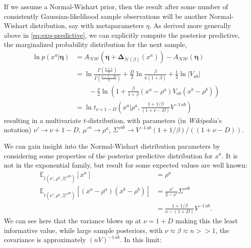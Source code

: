 \documentclass[aps,showpacs,twocolumn,prd,superscriptaddress,nofootinbib]{revtex4}
\newcommand{\nn}{\nonumber}
\newcommand{\E}[1]{{\mathbb E}_{#1}\!}
\begin{document}
If we assume a Normal-Wishart prior, then the result after some number of consistently Gaussian-likelihood sample observations will be another Normal-Wishart distribution, say with metaparameters $\eta$.  As derived more generally above in \eqref{eq:exp-predictive}, we can explicitly compute the posterior predictive, the marginalized probability distribution for the next sample,
\begin{align}
  \ln p(x^a|\bm\eta)&=A_{\mathcal{NW}}(\bm\eta+\bm\Delta_{\mathcal{N}(\beta)}(x^a))-A_{\mathcal{NW}}(\bm\eta)\nn\\
  &=\ln\frac{\Gamma\left(\frac{\nu+1}2\right)}{\Gamma\left(\frac{\nu+1-D}{2}\right)}+\frac D2\ln\frac{\beta}{\pi(1+\beta)}+\frac12\ln\left|V_{ab}\right|
  \nn\\&\qquad
  -\frac\nu2\ln\left(1+\frac\beta{1+\beta}(x^a-\rho^a)V_{ab}(x^b-\rho^b)\right)\nn\\
  &=\ln t_{\nu+1-D}\left(x^a\big|\rho^a,\frac{1+1/\beta}{(1+\nu-D)}V^{-1\,ab}\right)\label{eq:norm-predictive}
\end{align}
resulting in a multivariate $t$-distribution, with parameters (in \textit{Wikipedia}'s notation) $\nu'\rightarrow\nu+1-D$, $\mu'^a\rightarrow\rho^a$, $\Sigma'^{ab}\rightarrow V^{-1\,ab}({1+1/\beta})/({(1+\nu-D)})$.

We can gain insight into the Normal-Wishart distribution parameters by considering some properties of the posterior predictive distribution for $x^a$. It is not in the exponential family, but result for some expected values are well known:
\begin{align}
\E{t(\nu',\rho^a,\Sigma'^{ab})}\left[x^a\right]&=\rho^a\nn\\
\E{t(\nu',\rho^a,\Sigma'^{ab})}\left[(x^a-\rho^a)(x^b-\rho^b)\right]&=\frac{\nu'}{2-\nu'}\Sigma'^{ab}\nn\\
&=\frac{1+1/\beta}{\nu-(1+D)}V^{-1\,ab}\nn
.
\end{align}
We can see here that the variance blows up at $\nu=1+D$ making this the least informative value, while large sample posteriors, with $\nu\approx\beta\approx n>>1$, the covariance is approximately $(nV)^{-1\,ab}$. In this limit:
\end{document}
